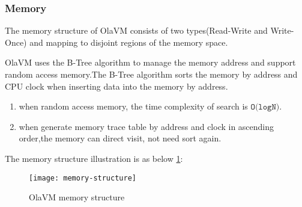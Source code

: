 \subsubsection{Memory}\label{subsec: ola-memory}
The memory structure of OlaVM consists of two types(Read-Write and Write-Once) and mapping to disjoint regions of the memory space.
\begin{table}[!ht]
    \caption{Memory segment range}
    \label{table:memory-segment-range}
\end{table}


OlaVM uses the B-Tree algorithm to manage the memory address and support random access memory.The B-Tree algorithm sorts the memory by address and CPU clock when inserting data into the memory by address.
\begin{enumerate}
    \item when random access memory, the time complexity of search is $\texttt{O(logN)}$.
    \item when generate memory trace table by address and clock in ascending order,the memory can direct visit, not need sort again.
\end{enumerate}

The memory structure illustration is as below \ref{fig: B-tree-memory}:
\begin{figure}[!htp]
    \centering
    \texttt{[image: memory-structure]}
    \caption{OlaVM memory structure}
    \label{fig: B-tree-memory}
\end{figure}